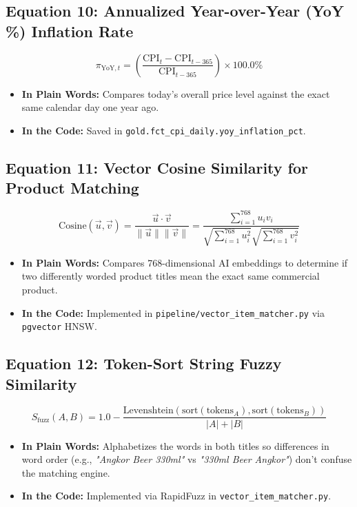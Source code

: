 \documentclass[11pt,a4paper,oneside]{article}
\begin{document}
\subsection{Equation 10: Annualized Year-over-Year (YoY \%) Inflation Rate}
\begin{equation}
\pi_{\text{YoY}, t} = \left( \frac{\text{CPI}_t - \text{CPI}_{t-365}}{\text{CPI}_{t-365}} \right) \times 100.0\%
\end{equation}
\begin{itemize}
    \item \textbf{In Plain Words:} Compares today's overall price level against the exact same calendar day one year ago.
    \item \textbf{In the Code:} Saved in \texttt{gold.fct\_cpi\_daily.yoy\_inflation\_pct}.
\end{itemize}

\subsection{Equation 11: Vector Cosine Similarity for Product Matching}
\begin{equation}
\text{Cosine}(\vec{u}, \vec{v}) = \frac{\vec{u} \cdot \vec{v}}{\|\vec{u}\| \|\vec{v}\|} = \frac{\sum_{i=1}^{768} u_i v_i}{\sqrt{\sum_{i=1}^{768} u_i^2} \sqrt{\sum_{i=1}^{768} v_i^2}}
\end{equation}
\begin{itemize}
    \item \textbf{In Plain Words:} Compares 768-dimensional AI embeddings to determine if two differently worded product titles mean the exact same commercial product.
    \item \textbf{In the Code:} Implemented in \texttt{pipeline/vector\_item\_matcher.py} via \texttt{pgvector} HNSW.
\end{itemize}

\subsection{Equation 12: Token-Sort String Fuzzy Similarity}
\begin{equation}
S_{\text{fuzz}}(A, B) = 1.0 - \frac{\text{Levenshtein}(\text{sort}(\text{tokens}_A), \text{sort}(\text{tokens}_B))}{|A| + |B|}
\end{equation}
\begin{itemize}
    \item \textbf{In Plain Words:} Alphabetizes the words in both titles so differences in word order (e.g., \textit{"Angkor Beer 330ml"} vs \textit{"330ml Beer Angkor"}) don't confuse the matching engine.
    \item \textbf{In the Code:} Implemented via RapidFuzz in \texttt{vector\_item\_matcher.py}.
\end{itemize}
\end{document}
